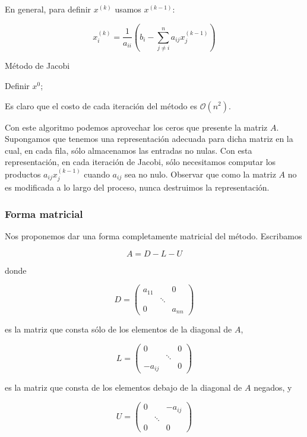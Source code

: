 En general, para definir $x^{(k)}$ usamos $x^{(k - 1)}$:

\[x_i^{(k)} = \frac{1}{a_{ii}}\left(b_i - \sum_{j \neq i}^n a_{ij}x_j^{(k - 1)}\right)\]

\begin{algorithm}
\caption[]{Método de Jacobi}
Definir $x^0$;\\
\end{algorithm}

Es claro que el costo de cada iteración del método es $\mathcal{O}(n^2)$.

Con este algoritmo podemos aprovechar los ceros que presente la matriz $A$. Supongamos que tenemos una representación adecuada para dicha matriz en la cual, en cada fila, sólo almacenamos las entradas no nulas. Con esta representación, en cada iteración de Jacobi, sólo necesitamos computar los productos $a_{ij}x_j^{(k - 1)}$ cuando $a_{ij}$ sea no nulo. Observar que como la matriz $A$ no es modificada a lo largo del proceso, nunca destruimos la representación.

\subsubsection{Forma matricial}

Nos proponemos dar una forma completamente matricial del método. Escribamos

\[A = D - L - U\]

donde 

\[D = \begin{pmatrix}
a_{11} 	& 			& 0	\\
		& \ddots		& 	\\
0		&			& a_{nn}\end{pmatrix}\]

es la matriz que consta sólo de los elementos de la diagonal de $A$,

\[L = \begin{pmatrix}
0 		& 			& 0	\\
		& \ddots		& 	\\
-a_{ij}	&			& 0\end{pmatrix}\]

es la matriz que consta de los elementos debajo de la diagonal de $A$ negados, y

\[U = \begin{pmatrix}
0	 	& 			& -a_{ij}	\\
		& \ddots		& 	\\
0		&			& 0\end{pmatrix}\]

